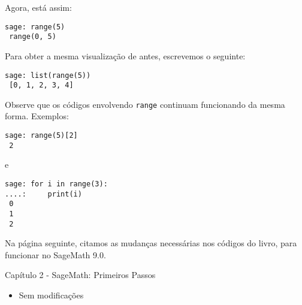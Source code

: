 \documentclass[10pt,a4paper]{report}
\begin{document}
Agora, está assim:
\begin{lstlisting}[frame=e, numbers=none, xleftmargin=0em]
sage: range(5)
 range(0, 5)
\end{lstlisting}

Para obter a mesma visualização de antes, escrevemos o seguinte:
\begin{lstlisting}[frame=e, numbers=none, xleftmargin=0em]
sage: list(range(5))
 [0, 1, 2, 3, 4] 
\end{lstlisting}





Observe que os códigos envolvendo \verb|range| continuam funcionando da mesma forma. Exemplos:
\begin{lstlisting}[frame=e, numbers=none, xleftmargin=0em]
sage: range(5)[2]
 2
\end{lstlisting}
e
\begin{lstlisting}[frame=e, numbers=none, xleftmargin=0em]
sage: for i in range(3):
....:     print(i)
 0
 1
 2
\end{lstlisting}

Na página seguinte, citamos as mudanças necessárias nos códigos do livro, para funcionar no SageMath 9.0.

\newpage


\noindent
{ \large Capítulo 2 - SageMath: Primeiros Passos}

\begin{itemize}
 \item Sem modificações
\end{itemize}
\end{document}
